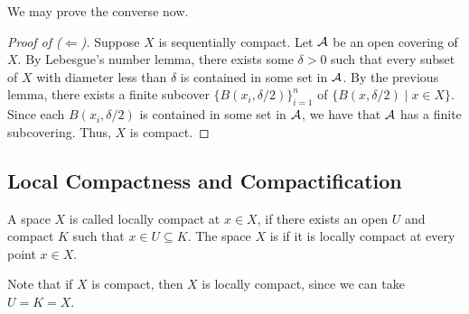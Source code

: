 We may prove the converse now.
\begin{proof}[Proof of ($\Leftarrow$)]
    Suppose $X$ is sequentially compact. Let $\mathcal{A}$ be an open covering of $X$. By Lebesgue's number lemma, there exists some $\delta > 0$ such that every subset of $X$ with diameter less than $\delta$ is contained in some set in $\mathcal{A}$. By the previous lemma, there exists a finite subcover $\{B(x_{i},\delta/2)\}_{i=1}^{n}$ of $\{B(x,\delta/2) \mid x \in X\}$. Since each $B(x_{i},\delta/2)$ is contained in some set in $\mathcal{A}$, we have that $\mathcal{A}$ has a finite subcovering. Thus, $X$ is compact.
\end{proof}

\subsection{Local Compactness and Compactification}

\begin{definition}
    A space $X$ is called locally compact at $x \in X$, if there exists an open $U$ and compact $K$ such that $x \in U \subseteq K$. The space $X$ is  if it is locally compact at every point $x \in X$.
\end{definition}

Note that if $X$ is compact, then $X$ is locally compact, since we can take $U = K = X$.

